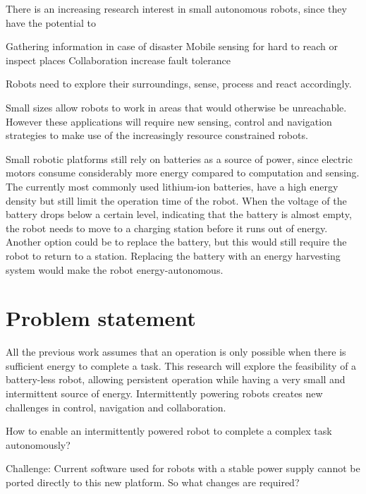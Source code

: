 There is an increasing research interest in small autonomous robots, since they have the potential to 



Gathering information in case of disaster
Mobile sensing for hard to reach or inspect places
Collaboration increase fault tolerance


Robots need to explore their surroundings, sense, process and react accordingly.	


Small sizes allow robots to work in areas that would otherwise be unreachable. 
However these applications will require new sensing, control and navigation strategies to make use of the increasingly resource constrained robots.

Small robotic platforms still rely on batteries as a source of power, since electric motors consume considerably more energy compared to computation and sensing.
The currently most commonly used lithium-ion batteries, have a high energy density but still limit the operation time of the robot.
When the voltage of the battery drops below a certain level, indicating that the battery is almost empty, the robot needs to move to a charging station before it runs out of energy.
Another option could be to replace the battery, but this would still require the robot to return to a station.
Replacing the battery with an energy harvesting system would make the robot energy-autonomous. 


\section{Problem statement}

All the previous work assumes that an operation is only possible when there is sufficient energy to complete a task.
This research will explore the feasibility of a battery-less robot, allowing persistent operation while having a very small and intermittent source of energy.
Intermittently powering robots creates new challenges in control, navigation and collaboration.


How to enable an intermittently powered robot to complete a complex task autonomously?

Challenge:
Current software used for robots with a stable power supply cannot be ported directly to this new platform.
So what changes are required?

